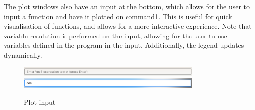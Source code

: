 The plot windows also have an input at the bottom, which allows for the user to input a function and have it plotted
on command\ref{fig:plot-input}.
This is useful for quick visualisation of functions, and allows for a more interactive experience.
Note that variable resolution is performed on the input, allowing for the user to use variables defined in the
program in the input.
Additionally, the legend updates dynamically.

\begin{figure}[H]
    \centering
    \includegraphics[width=0.8\textwidth]{assets/plotInput}
    \includegraphics[width=0.8\textwidth]{assets/plotInput2}
    \caption{Plot input}\label{fig:plot-input}
\end{figure}